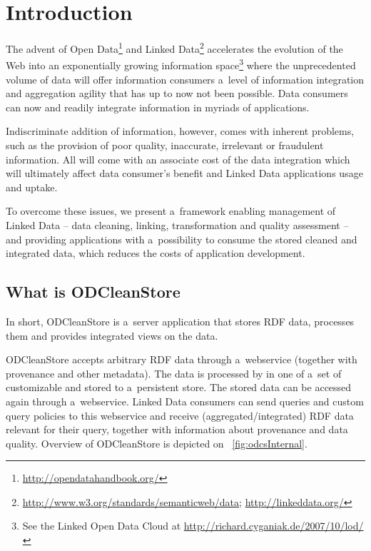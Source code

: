 
\newcommand{\version}{0.3.6}
\newcommand{\documentname}{\refusermanual}





\renewcommand{\contentsname}{Contents}
\tableofcontents
\bigskip

\newpage


\chapter{Introduction}
\label{chap:introduction}

The advent of Open Data\footnote{\url{http://opendatahandbook.org/}} and Linked Data\footnote{\url{http://www.w3.org/standards/semanticweb/data}; \url{http://linkeddata.org/}}  accelerates the evolution of the Web into an exponentially growing information space\footnote{See the Linked Open Data Cloud at \url{http://richard.cyganiak.de/2007/10/lod/}} where the unprecedented volume of data will offer information consumers a~level of information integration and aggregation agility that has up to now not been possible. Data consumers can now  and readily integrate information in myriads of applications.

Indiscriminate addition of information, however, comes with inherent problems, such as the provision of poor quality, inaccurate, irrelevant or fraudulent information. All will come with an associate cost of the data integration which will ultimately affect data consumer's benefit and Linked Data applications usage and uptake.

To overcome these issues, we present a~framework enabling management of Linked Data -- data cleaning, linking, transformation and quality assessment -- and providing  applications with a~possibility to consume the stored cleaned and integrated data, which reduces the costs of application development.

\section{What is ODCleanStore}

In short, ODCleanStore is a~server application that stores RDF data, processes them and provides integrated views on the data.

ODCleanStore accepts arbitrary RDF data through a~webservice (together with provenance and other metadata). The data is processed by  in one of a~set of customizable  and stored to a~persistent store. The stored data can be accessed again through a~webservice. Linked Data consumers can send queries and custom query policies to this webservice and receive (aggregated/integrated) RDF data relevant for their query, together with information about provenance and data quality. Overview of ODCleanStore is depicted on \figurename~\ref{fig:odcsInternal}.

